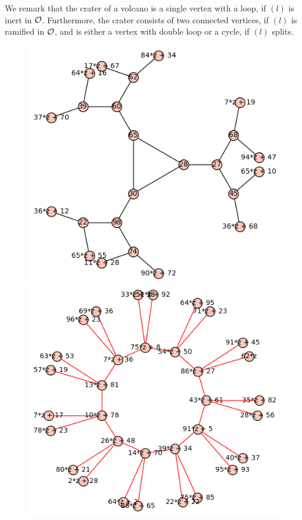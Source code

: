 We remark that the crater of a volcano is a single vertex with a loop, if $(l)$ is inert in $\mathcal{O}$.
Furthermore, the crater consists of two connected vertices, if $(l)$ is ramified in $\mathcal{O}$, and is either a vertex with double loop or a cycle, if $(l)$ splits.
\begin{figure}
    \begin{minipage}{0.5\textwidth}
        \includegraphics[width = \textwidth]{../example_odd_crater_fp.png}
    \end{minipage}%
    \begin{minipage}{0.5\textwidth}
        \includegraphics[width = \textwidth]{../example_odd_crater.png}

\end{minipage}
\end{figure}
